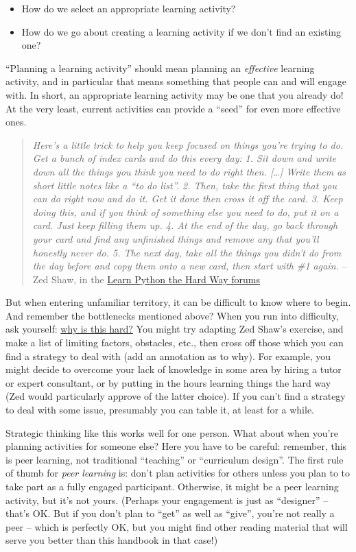 \begin{itemize}
\item
  How do we select an appropriate learning activity?
\item
  How do we go about creating a learning activity if we don't find an
  existing one?
\end{itemize}
``Planning a learning activity'' should mean planning an
\emph{effective} learning activity, and in particular that means
something that people can and will engage with. In short, an appropriate
learning activity may be one that you already do! At the very least,
current activities can provide a ``seed'' for even more effective ones.

\begin{quote}
\emph{Here's a little trick to help you keep focused on things you're
trying to do. Get a bunch of index cards and do this every day:}
\emph{1. Sit down and write down all the things you think you need to do
right then. {[}\ldots{}{]} Write them as short little notes like a ``to
do list''. 2. Then, take the first thing that you can do right now and
do it. Get it done then cross it off the card. 3. Keep doing this, and
if you think of something else you need to do, put it on a card. Just
keep filling them up. 4. At the end of the day, go back through your
card and find any unfinished things and remove any that you'll honestly
never do. 5. The next day, take all the things you didn't do from the
day before and copy them onto a new card, then start with \#1 again.} --
Zed Shaw, in the
\href{http://learnpythonthehardway.org/book/intro.html\#comment-409972596}{Learn
Python the Hard Way forums}
\end{quote}
But when entering unfamiliar territory, it can be difficult to know
where to begin. And remember the bottlenecks mentioned above? When you
run into difficulty, ask yourself:
\href{http://peeragogy.org/patterns-and-heuristics/}{why is this hard?}
You might try adapting Zed Shaw's exercise, and make a list of limiting
factors, obstacles, etc., then cross off those which you can find a
strategy to deal with (add an annotation as to why). For example, you
might decide to overcome your lack of knowledge in some area by hiring a
tutor or expert consultant, or by putting in the hours learning things
the hard way (Zed would particularly approve of the latter choice). If
you can't find a strategy to deal with some issue, presumably you can
table it, at least for a while.

Strategic thinking like this works well for one person. What about when
you're planning activities for someone else? Here you have to be
careful: remember, this is peer learning, not traditional ``teaching''
or ``curriculum design''. The first rule of thumb for \emph{peer
learning} is: don't plan activities for others unless you plan to to
take part as a fully engaged participant. Otherwise, it might be a peer
learning activity, but it's not yours. (Perhaps your engagement is just
as ``designer'' -- that's OK. But if you don't plan to ``get'' as well
as ``give'', you're not really a peer -- which is perfectly OK, but you
might find other reading material that will serve you better than this
handbook in that case!)

